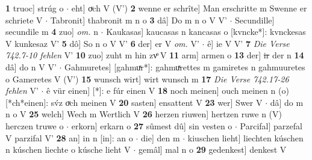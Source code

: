 \documentclass[8pt,a4paper,notitlepage]{article}
\begin{document}
\begin{table}[ht]
\begin{minipage}[t]{0.5\linewidth}
\textbf{1} truoc] strúg o  $\cdot$ eht] oͮch V (V') \textbf{2} wenne er schrîte] Man erschritte m Swenne er schriete V  $\cdot$ Tabronit] thabronit m n o \textbf{3} dâ] Do m n o V V'  $\cdot$ Secundille] secundile m \textbf{4} zuo] \textit{om.} n  $\cdot$ Kaukasas] kaucasas n kancasas o [kvncke*]: kvnckesas V kunkesaz V' \textbf{5} dô] So n o V V' \textbf{6} der] er V \textit{om.} V'  $\cdot$ ê] ie V V' \textbf{7} \textit{Die Verse 742.7-10 fehlen} V'  \textbf{10} zuo] zuht m hin zvͦ V \textbf{11} arm] armen o \textbf{13} der] \sout{ir} der n \textbf{14} dâ] do n V V'  $\cdot$ Gahmuretes] [gahmuͯr*]: gahmuͯrettes m gamiretes n gahmuuretes o Gameretes V (V') \textbf{15} wunsch wirt] wirt wunsch m \textbf{17} \textit{Die Verse 742.17-26 fehlen} V'   $\cdot$ ê vür einen] [*]: e fúr einen V \textbf{18} noch meinen] ouch meinen n (o) [*ch*einen]: sv́z oͮch meinen  V \textbf{20} sasten] ensattent V \textbf{23} wer] Swer V  $\cdot$ dâ] do m n o V \textbf{25} welch] Wech m Wertlich V \textbf{26} herzen riuwen] hertzen ruwe n (V) herczen truwe o  $\cdot$ erkorn] erkarn o \textbf{27} sûmest dû] sin vesten o  $\cdot$ Parcifal] parzefal V parzifal V' \textbf{28} an] in n [in]: an o  $\cdot$ die] den m  $\cdot$ kiuschen lieht] liechten kúschen n kúschen liechte o kúsche lieht V  $\cdot$ gemâl] mal n o \textbf{29} gedenkest] denkest V \newline
\end{minipage}
\end{table}
\newpage
\end{document}
